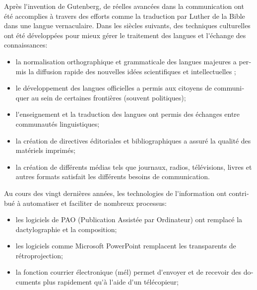 \documentclass[]{../metanetpaper}
\begin{document}
\begin{french}
\begin{multicols}{2}

Après l{\mbox '}invention de Gutenberg, de réelles avancées dans la
communication ont été accomplies à travers des efforts comme la
traduction par Luther de la Bible dans une langue vernaculaire. Dans
les siècles suivants, des techniques culturelles ont été développées
pour mieux gérer le traitement des langues et l{\mbox '}échange des
connaissances:

\begin{itemize}

\item la normalisation orthographique et grammaticale des langues
  majeures a permis la diffusion rapide des nouvelles idées
  scientifiques et intellectuelles ;

\item le développement des langues officielles a permis aux citoyens
  de communiquer au sein de certaines frontières (souvent politiques);

\item l{\mbox '}enseignement et la traduction des langues ont permis des
  échanges entre communautés linguistiques;

\item la création de directives éditoriales et bibliographiques a
  assuré la qualité des matériels imprimés;

\item la création de différents médias tels que journaux, radios,
  télévisions, livres et autres formats satisfait les différents
  besoins de communication.

\end{itemize}

Au cours des vingt dernières années, les technologies de
l{\mbox '}information ont contribué à automatiser et faciliter de
nombreux processus:

\begin{itemize}

\item les logiciels de PAO (Publication Assistée par Ordinateur) ont
  remplacé la dactylographie et la composition;

\item les logiciels comme Microsoft PowerPoint remplacent les
  transparents de rétroprojection;

\item la fonction courrier électronique (mél) permet d{\mbox '}envoyer
  et de recevoir des documents plus rapidement qu{\mbox '}à l{\mbox
   '}aide d{\mbox '}un télécopieur;


\end{itemize}
\end{multicols}
\end{french}
\end{document}
